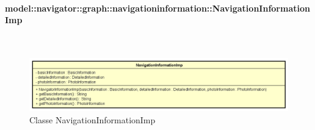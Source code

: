 \documentclass[../DefinizioneDiProdotto.tex]{subfiles}
\begin{document}
\paragraph{model::navigator::graph::navigationinformation::\newline NavigationInformationImp}
\
\begin{figure}[H]
	\centering
	\includegraphics[width=\maxwidth]{img/NavigationInformationImp.png}
	\caption{Classe NavigationInformationImp}\label{fig:model::navigator::graph::navigationinformation::NavigationInformationImp} 
\end{figure}
\end{document}
